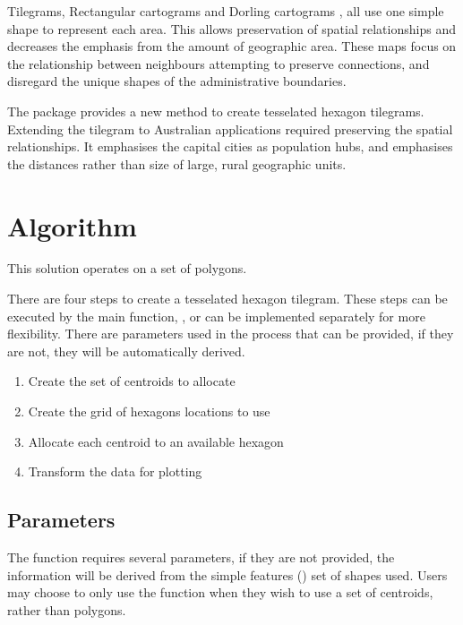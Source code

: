 \documentclass[
]{jss}
\providecommand{\tightlist}{%
  \setlength{\itemsep}{0pt}\setlength{\parskip}{0pt}}
\begin{document}
Tilegrams, Rectangular cartograms \citep{ORC} and Dorling cartograms
\citep{ACTUC}, all use one simple shape to represent each area. This
allows preservation of spatial relationships and decreases the emphasis
from the amount of geographic area. These maps focus on the relationship
between neighbours attempting to preserve connections, and disregard the
unique shapes of the administrative boundaries.

The  package provides a new method to create tesselated
hexagon tilegrams. Extending the tilegram to Australian applications
required preserving the spatial relationships. It emphasises the capital
cities as population hubs, and emphasises the distances rather than size
of large, rural geographic units.

\hypertarget{algorithm}{%
\section{Algorithm}\label{algorithm}}

This solution operates on a set of  \citep{sf} polygons.

There are four steps to create a tesselated hexagon tilegram. These
steps can be executed by the main function, , or can
be implemented separately for more flexibility. There are parameters
used in the process that can be provided, if they are not, they will be
automatically derived.

\begin{enumerate}
\def\labelenumi{\arabic{enumi}.}
\tightlist
\item
  Create the set of centroids to allocate
\item
  Create the grid of hexagons locations to use
\item
  Allocate each centroid to an available hexagon
\item
  Transform the data for plotting
\end{enumerate}

\hypertarget{parameters}{%
\subsection{Parameters}\label{parameters}}

The  function requires several parameters, if they
are not provided, the information will be derived from the simple
features () set of shapes used. Users may choose to only use the
 function when they wish to use a set of centroids,
rather than  polygons.
\end{document}
